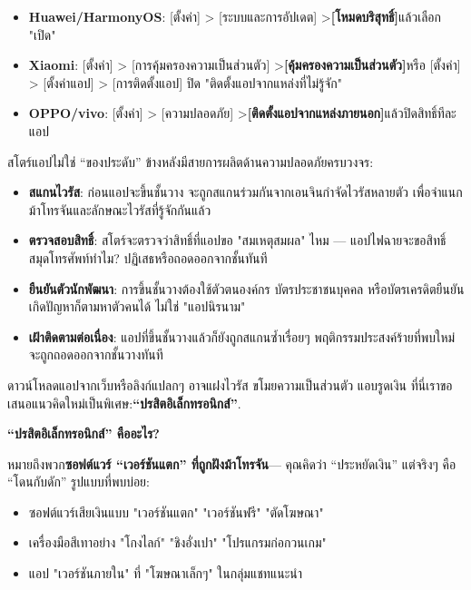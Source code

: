 \begin{itemize}
  \item \textbf{Huawei/HarmonyOS}: [ตั้งค่า] > [ระบบและการอัปเดต] >\textbf{[โหมดบริสุทธิ์]}แล้วเลือก "เปิด"
  \item \textbf{Xiaomi}: [ตั้งค่า] > [การคุ้มครองความเป็นส่วนตัว] >\textbf{[คุ้มครองความเป็นส่วนตัว]}หรือ [ตั้งค่า] > [ตั้งค่าแอป] > [การติดตั้งแอป] ปิด "ติดตั้งแอปจากแหล่งที่ไม่รู้จัก"
  \item \textbf{OPPO/vivo}: [ตั้งค่า] > [ความปลอดภัย] >\textbf{[ติดตั้งแอปจากแหล่งภายนอก]}แล้วปิดสิทธิ์ทีละแอป
\end{itemize}


สโตร์แอปไม่ใช่ “ของประดับ” ข้างหลังมีสายการผลิตด้านความปลอดภัยครบวงจร:

\begin{itemize}
  \item \textbf{สแกนไวรัส}: ก่อนแอปจะขึ้นชั้นวาง จะถูกสแกนร่วมกันจากเอนจินกำจัดไวรัสหลายตัว เพื่อจำแนกม้าโทรจันและลักษณะไวรัสที่รู้จักกันแล้ว
  \item \textbf{ตรวจสอบสิทธิ์}: สโตร์จะตรวจว่าสิทธิ์ที่แอปขอ "สมเหตุสมผล" ไหม — แอปไฟฉายจะขอสิทธิ์สมุดโทรศัพท์ทำไม? ปฏิเสธหรือถอดออกจากชั้นทันที
  \item \textbf{ยืนยันตัวนักพัฒนา}: การขึ้นชั้นวางต้องใช้ตัวตนองค์กร บัตรประชาชนบุคคล หรือบัตรเครดิตยืนยัน เกิดปัญหาก็ตามหาตัวคนได้ ไม่ใช่ "แอปนิรนาม"
  \item \textbf{เฝ้าติดตามต่อเนื่อง}: แอปที่ขึ้นชั้นวางแล้วก็ยังถูกสแกนซ้ำเรื่อยๆ พฤติกรรมประสงค์ร้ายที่พบใหม่จะถูกถอดออกจากชั้นวางทันที
\end{itemize}


ดาวน์โหลดแอปจากเว็บหรือลิงก์แปลกๆ อาจแฝงไวรัส ขโมยความเป็นส่วนตัว แอบรูดเงิน ที่นี่เราขอเสนอแนวคิดใหม่เป็นพิเศษ:\textbf{“ปรสิตอิเล็กทรอนิกส์”}.

\textbf{“ปรสิตอิเล็กทรอนิกส์” คืออะไร?}\par

หมายถึงพวก\textbf{ซอฟต์แวร์ “เวอร์ชันแตก” ที่ถูกฝังม้าโทรจัน}— คุณคิดว่า “ประหยัดเงิน” แต่จริงๆ คือ “โดนกับดัก” รูปแบบที่พบบ่อย:

\begin{itemize}
  \item ซอฟต์แวร์เสียเงินแบบ "เวอร์ชันแตก" "เวอร์ชันฟรี" "ตัดโฆษณา"
  \item เครื่องมือสีเทาอย่าง "โกงไลก์" "ชิงอั่งเปา" "โปรแกรมก่อกวนเกม"
  \item แอป "เวอร์ชันภายใน" ที่ "โฆษณาเล็กๆ" ในกลุ่มแชทแนะนำ
\end{itemize}

